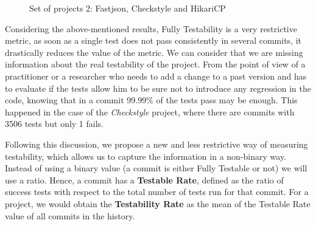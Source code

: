 \begin{figure}[!htb]
\begin{minipage}{.5\linewidth}
        \label{fig:hikari}
    \end{minipage}%
    \caption{Set of projects 2: Fastjson, Checkstyle and HikariCP}
    \label{fig:projects-2}
\end{figure}

\begin{table}[h!]
    \centering
    \caption{Metrics of set of projects 1: Fastjson, Checkstyle and HikariCP}
    \label{table:projects-2}
\end{table}

Considering the above-mentioned results, Fully Testability is a very restrictive metric, as soon as a single test does not pass consistently in several commits, it drastically reduces the value of the metric. 
We can consider that we are missing information about the real testability of the project.
From the point of view of a practitioner or a researcher who needs to add a change to a past version and has to evaluate if the tests allow him to be sure not to introduce any regression in the code, knowing that in a commit 99.99\% of the tests pass may be enough.
This happened in the case of the \textit{Checkstyle} project, where there are commits with 3506 tests but only 1 fails.

Following this discussion, we propose a new and less restrictive way of measuring testability, which allows us to capture the information in a non-binary way. 
Instead of using a binary value (a commit is either Fully Testable or not) we will use a ratio. 
Hence, a commit has a \textbf{Testable Rate}, defined as the ratio of success tests with respect to the total number of tests run for that commit.
For a project, we would obtain the \textbf{Testability Rate} as the mean of the Testable Rate value of all commits in the history.

